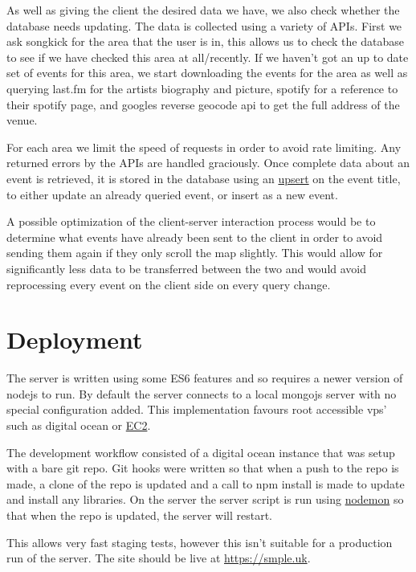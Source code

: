 \documentclass[10pt]{article}
\begin{document}
        As well as giving the client the desired data we have, we also check whether the database needs updating. The data is collected using a variety of APIs. First we ask songkick for the area that the user is in, this allows us to check the database to see if we have checked this area at all/recently. If we haven't got an up to date set of events for this area, we start downloading the events for the area as well as querying last.fm for the artists biography and picture, spotify for a reference to their spotify page, and googles reverse geocode api to get the full address of the venue.

        For each area we limit the speed of requests in order to avoid rate limiting. Any returned errors by the APIs are handled graciously. Once complete data about an event is retrieved, it is stored in the database using an \href{https://docs.mongodb.com/manual/reference/method/db.collection.update/#upsert-option}{upsert} on the event title, to either update an already queried event, or insert as a new event.

        A possible optimization of the client-server interaction process would be to determine what events have already been sent to the client in order to avoid sending them again if they only scroll the map slightly. This would allow for significantly less data to be transferred between the two and would avoid reprocessing every event on the client side on every query change.


    \section{Deployment}
        The server is written using some ES6 features and so requires a newer version of nodejs to run. By default the server connects to a local mongojs server with no special configuration added. This implementation favours root accessible vps' such as digital ocean or \href{https://aws.amazon.com/ec2/}{EC2}.

        The development workflow consisted of a digital ocean instance that was setup with a bare git repo. Git hooks were written so that when a push to the repo is made, a clone of the repo is updated and a call to npm install is made to update and install any libraries. On the server the server script is run using \href{https://github.com/remy/nodemon}{nodemon} so that when the repo is updated, the server will restart.

        This allows very fast staging tests, however this isn't suitable for a production run of the server. The site should be live at \href{https://smple.uk}{https://smple.uk}.
\end{document}
